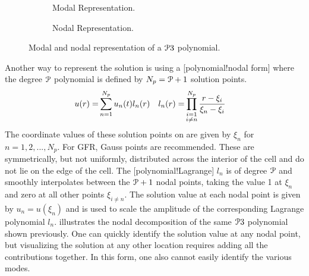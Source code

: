 
\begin{figure}
  \begin{centering}
    \begin{subfigure}{3.0in}
      \caption{Modal Representation.}
      \label{FIG:Polynomial_Form_Modal}
    \end{subfigure}%
    \begin{subfigure}{3.0in}
      \caption{Nodal Representation.}
      \label{FIG:Polynomial_Form_Nodal}
    \end{subfigure}
    \caption{Modal and nodal representation of a $\PO[3]$ polynomial.}
    \label{FIG:Polynomial_Form}
  \end{centering}
\end{figure}


Another way to represent the solution is using a
[polynomial!nodal form]
where the degree $\PO$ polynomial is defined by $N_p=\PO+1$ solution points.
\begin{align}
  \label{EQN:Nodal_Form}
       u (r) =& \sum_{n=1}^{N_p} \uNodal[n] (t) l_n (r)
&    l_n (r) =& \prod_{\substack{ i=1 \\ i \neq n }}^{N_p}
                \frac{r-\xi_i}{\xi_n-\xi_i}
\end{align}
The coordinate values of these solution points on \stdelem{} are given by
$\xi_n$ for $n=1,2,...,N_p$.
%
For GFR, Gauss points are recommended.
%
These are symmetrically, but not uniformly, distributed across the
interior of the cell and do not lie on the edge of the cell.
%
The [polynomial!Lagrange] $l_n$ is of degree $\PO$
and smoothly interpolates between the $\PO+1$ nodal points, taking the value
1 at $\xi_n$ and zero at all other points $\xi_{i \neq n}$.
The solution value at each nodal point is given by $u_n=u(\xi_n)$
and is used to scale the amplitude of the corresponding Lagrange
polynomial $l_n$.
%
 illustrates the nodal decomposition
of the same $\PO[3]$ polynomial shown previously. One can quickly identify
the solution value at any nodal point, but visualizing the solution
at any other location requires adding all the contributions together.
In this form, one also cannot easily identify the various modes.

